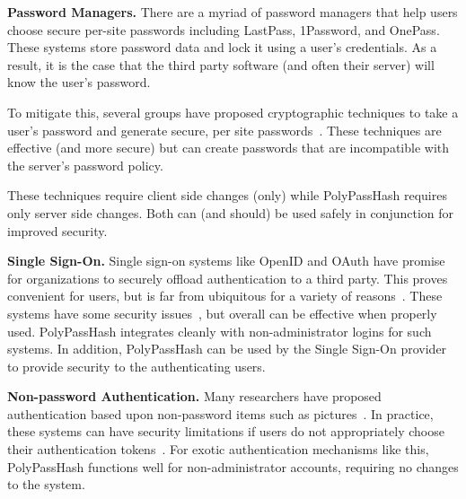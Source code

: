 {\bf Password Managers.}
There are a myriad of password managers that help users choose secure
per-site passwords including LastPass, 1Password, and OnePass.   These
systems store password data and lock it using a user's credentials.   As a
result, it is the case that the third party software (and often their server)
will know the user's password.

To mitigate this, several groups have proposed cryptographic techniques
to take a user's password and generate secure, per site 
passwords~\cite{halderman2009lest,ross2005stronger, halderman2005convenient}.
These techniques are effective (and more secure) but can create passwords that 
are incompatible with the server's password policy.

These techniques require client side changes (only) while PolyPassHash
requires only server side changes.   Both can (and should) be used safely 
in conjunction for improved security.


{\bf Single Sign-On.}
Single sign-on systems like OpenID and OAuth have promise for organizations to
securely offload authentication
to a third party.   This proves convenient for users, but is far from 
ubiquitous for a variety of reasons~\cite{sun2010billion}.  These
systems have some security issues~\cite{openidsecurity,oauthsecurity}, but
overall can be effective when properly used.   PolyPassHash integrates 
cleanly with non-administrator logins for such systems.   In addition,
PolyPassHash can be used by the Single Sign-On provider to provide 
security to the authenticating users.

{\bf Non-password Authentication.}
Many researchers have proposed authentication based upon non-password items
such as pictures~\cite{dhamija2000deja}.   In practice, these
systems can have security limitations if users do not appropriately choose
their authentication tokens~\cite{davis2004user}.   For exotic 
authentication mechanisms like this, PolyPassHash functions well for 
non-administrator accounts, requiring no changes to the system.






